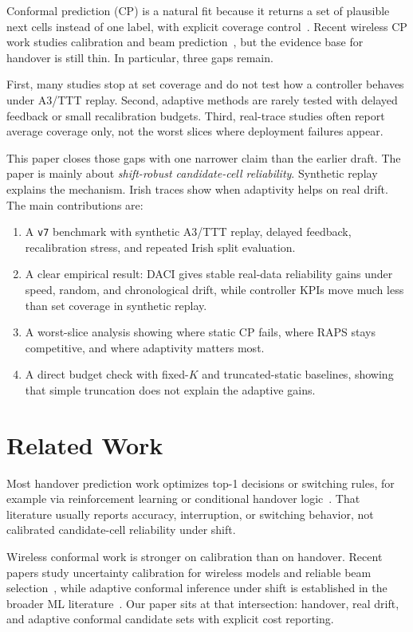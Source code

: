 \documentclass[conference]{IEEEtran}
\begin{document}
Conformal prediction (CP) is a natural fit because it returns a set of plausible next cells instead of one label, with explicit coverage control~\cite{vovk2005,angelopoulos2021}. Recent wireless CP work studies calibration and beam prediction~\cite{cohen2022,hegde2024,deng2025}, but the evidence base for handover is still thin. In particular, three gaps remain.

First, many studies stop at set coverage and do not test how a controller behaves under A3/TTT replay. Second, adaptive methods are rarely tested with delayed feedback or small recalibration budgets. Third, real-trace studies often report average coverage only, not the worst slices where deployment failures appear.

This paper closes those gaps with one narrower claim than the earlier draft. The paper is mainly about \emph{shift-robust candidate-cell reliability}. Synthetic replay explains the mechanism. Irish traces show when adaptivity helps on real drift. The main contributions are:
\begin{enumerate}
    \item A \texttt{v7} benchmark with synthetic A3/TTT replay, delayed feedback, recalibration stress, and repeated Irish split evaluation.
    \item A clear empirical result: DACI gives stable real-data reliability gains under speed, random, and chronological drift, while controller KPIs move much less than set coverage in synthetic replay.
    \item A worst-slice analysis showing where static CP fails, where RAPS stays competitive, and where adaptivity matters most.
    \item A direct budget check with fixed-$K$ and truncated-static baselines, showing that simple truncation does not explain the adaptive gains.
\end{enumerate}

\section{Related Work}

Most handover prediction work optimizes top-1 decisions or switching rules, for example via reinforcement learning or conditional handover logic~\cite{yajnanarayana2020,lee2020}. That literature usually reports accuracy, interruption, or switching behavior, not calibrated candidate-cell reliability under shift.

Wireless conformal work is stronger on calibration than on handover. Recent papers study uncertainty calibration for wireless models and reliable beam selection~\cite{cohen2022,hegde2024,deng2025}, while adaptive conformal inference under shift is established in the broader ML literature~\cite{gibbs2021}. Our paper sits at that intersection: handover, real drift, and adaptive conformal candidate sets with explicit cost reporting.
\end{document}
